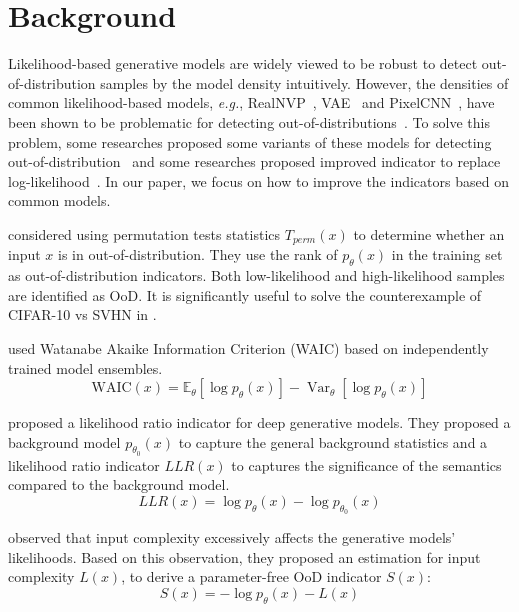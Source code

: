 \documentclass[letterpaper]{article} %
\newcommand{\EG}{\textit{e.g.}, }
\begin{document}
\section{Background}
Likelihood-based generative models are widely viewed to be robust to detect out-of-distribution samples by the model density intuitively. However, the densities of common likelihood-based models, \EG RealNVP~\cite{dinh2016density}, VAE~\cite{tomczak2018vae,takahashi2019variational} and PixelCNN~\cite{van2016conditional}, have been shown to be problematic for detecting out-of-distributions~\cite{nalisnick2018deep}. 
To solve this problem, some researches proposed some variants of these models for detecting out-of-distribution~\cite{che2019deep} and some researches proposed improved indicator to replace log-likelihood~\cite{serra2019input}. In our paper, we focus on how to improve the indicators based on common models. 

\cite{song2017pixeldefend} considered using permutation tests statistics $T_{perm}(x)$ to determine whether an input $x$ is in out-of-distribution. They use the rank of $p_\theta(x)$ in the training set as out-of-distribution indicators. Both low-likelihood and high-likelihood samples are identified as OoD. It is significantly useful to solve the counterexample of CIFAR-10 vs SVHN in \cite{nalisnick2018deep}. 

\cite{choi2018waic} used Watanabe Akaike Information Criterion (WAIC) based on independently trained model ensembles.
\begin{equation}
	\text{WAIC}(x) = \mathbb{E}_{\theta} [\log p_\theta(x)] - \operatorname{Var}_{\theta} [\log p_\theta(x)]
\end{equation}

\cite{ren2019likelihood} proposed a likelihood ratio indicator for deep generative models. They proposed a background model $p_{\theta_0}(x)$ to capture the general background statistics and a likelihood ratio indicator $LLR(x)$ to captures the significance of the semantics compared to the background model. 
\begin{equation}
LLR(x) = \log p_\theta(x) - \log p_{\theta_0}(x)
\end{equation}

\cite{serra2019input} observed that input complexity excessively affects the generative models' likelihoods. Based on this observation, they proposed an estimation for input complexity $L(x)$, to derive a parameter-free OoD indicator $S(x)$:
\begin{equation}
	S(x) = -\log p_\theta(x) - L(x)
\end{equation}
\end{document}
